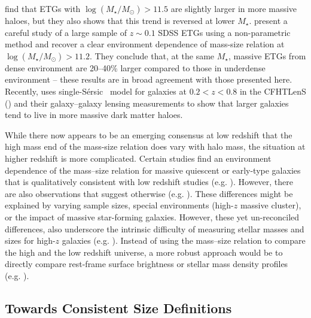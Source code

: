 \documentclass[a4paper,fleqn,usenatbib]{mnras}
\def\ser{{S\'{e}rsic\ }}
\def\mstar{{$M_{\star}$}}
\def\logms{{$\log (M_{\star}/M_{\odot})$}}
\begin{document}
    \citet{Cerbrian2014} find that ETGs with \logms{}$>11.5$ are slightly larger in 
    more massive haloes, but they also shows that this trend is reversed 
    at lower \mstar{}. 
    \citet{Yoon2017} present a careful study of a large sample of $z\sim0.1$ SDSS ETGs 
    using a non-parametric method and recover a clear environment dependence of 
    mass-size relation at \logms{}$>11.2$. 
    They conclude that, at the same \mstar{}, massive ETGs from dense environment 
    are 20--40\% larger compared to those in underdense environment -- these results are 
    in broad agreement with those presented here.
    Recently, \citet{Charlton2017} uses single-\ser{} model for galaxies at 
    $0.2 < z < 0.8$ in the CFHTLenS (\citealt{Heymans2012}) and their galaxy--galaxy 
    lensing measurements to show that larger galaxies tend to live in more massive 
    dark matter haloes. 
    
    While there now appears to be an emerging consensus at low redshift that the 
    high mass end of the mass-size relation does vary with halo mass, the situation at 
    higher redshift is more complicated. 
    Certain studies find an environment dependence of the mass--size relation for 
    massive quiescent or early-type galaxies that is qualitatively consistent with low 
    redshift studies (e.g. \citealt{Papovich2012, Lani2013, Strazzullo2013, 
    Delaye2014}). 
    However, there are also observations that suggest otherwise (e.g. 
    \citealt{Rettura2010, Raichoor2012, Kelkar2015, Allen2015}). 
    These differences might be explained by varying sample sizes, special environments
    (high-$z$ massive cluster), or the impact of massive star-forming galaxies. 
    However, these yet un-reconciled differences, also underscore the intrinsic 
    difficulty of measuring stellar masses and sizes for high-$z$ galaxies 
    (e.g. \cite{Price2017}). 
    Instead of using the mass--size relation to compare the high and the low redshift 
    universe, a more robust approach would be to directly compare rest-frame surface 
    brightness or stellar mass density profiles (e.g. \citealt{Szomoru2012, Patel2013,
    Buitrago2017, Hill2017}).
    
\subsection{Towards Consistent Size Definitions}
        
\end{document}
